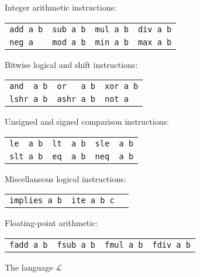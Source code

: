 \documentclass[a4paper]{llncs}
\begin{document}
 



\begin{figure}
\begin{center}
{\small

\setlength{\tabcolsep}{14pt}
Integer arithmetic instructions:

\begin{tabular}{llll}
 \verb|add a b| & \verb|sub a b| & \verb|mul a b| & \verb|div a b| \\
 \verb|neg a| &   \verb|mod a b| & \verb|min a b| & \verb|max a b|
\end{tabular}

\medskip

Bitwise logical and shift instructions:

\begin{tabular}{lll}
 \verb|and  a b| & \verb|or   a b| & \verb|xor a b| \\
 \verb|lshr a b| & \verb|ashr a b| & \verb|not a|
\end{tabular}

\medskip

Unsigned and signed comparison instructions:

\begin{tabular}{lll}
 \verb|le  a b| & \verb|lt  a b| & \verb|sle  a b| \\
 \verb|slt a b| & \verb|eq  a b| & \verb|neq  a b| \\
\end{tabular}

\medskip

Miscellaneous logical instructions:

\begin{tabular}{lll}
 \verb|implies a b| & \verb|ite a b c| &  \\
\end{tabular}

\medskip

\setlength{\tabcolsep}{12pt}

Floating-point arithmetic:

\begin{tabular}{llll}
 \verb|fadd a b| & \verb|fsub a b| & \verb|fmul a b| & \verb|fdiv a b|
\end{tabular}

}
\end{center}

 \caption{The language $\mathcal{L}$}
 \label{fig:l-language}
\end{figure}
\end{document}
